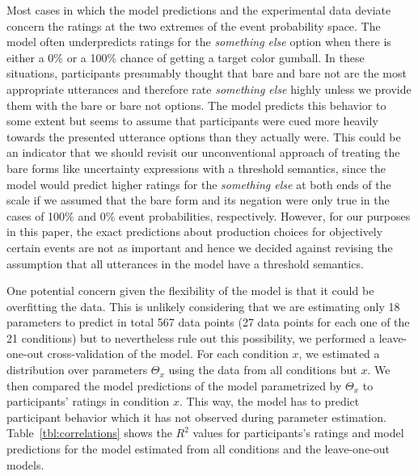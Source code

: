 \documentclass[man, floatsintext]{apa6}
\begin{document}
Most cases in which the model predictions and the experimental data deviate concern the ratings at the two extremes of the event probability space.
The model often underpredicts ratings for the \textit{something else} option when there is either a 0\% or a 100\% chance of 
getting a target color gumball. In these situations, participants presumably thought that {\sc bare} and {\sc bare not} are the most appropriate
utterances and therefore rate \textit{something else} highly unless we provide them with the {\sc bare} or {\sc bare not} options. The model predicts
this behavior to some extent but seems to assume that participants were cued more heavily towards the presented utterance options than they actually were.
This could be an indicator that we should revisit our unconventional approach of treating the bare forms like uncertainty expressions with a threshold semantics,
since the model would predict higher ratings for the \textit{something else} at both ends of the scale if we assumed that the bare form and its negation were only true
in the cases of 100\% and 0\% event probabilities, respectively. 
However, for our purposes in this paper, the exact predictions about production choices for objectively certain events are not as important and hence
we decided against revising the assumption that all utterances in the model have a threshold semantics.


One potential concern given the flexibility of the model is that it could be overfitting the data. 
This is unlikely considering that we are estimating only 18 parameters to predict in total 567 data points 
(27 data points for each one of the 21 conditions) but to nevertheless rule out this possibility, we performed a leave-one-out cross-validation of
the model. For each condition $x$, we estimated a distribution over parameters $\Theta_x$ using the data from all conditions but $x$. We then
compared the model predictions of the model parametrized by $\Theta_x$ to participants' ratings in condition $x$. This way, the model has to predict
participant behavior which it has not observed during parameter estimation. Table~\ref{tbl:correlations} shows the $R^2$ values for participants's
ratings and model predictions for the model estimated from all conditions and the leave-one-out models.
\end{document}
